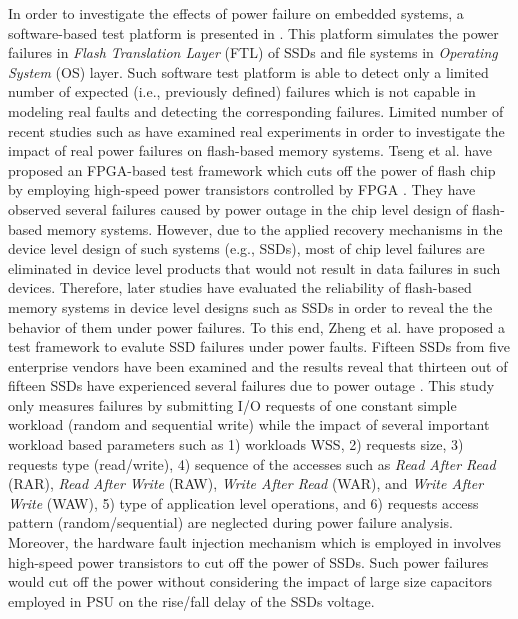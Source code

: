 In order to investigate the effects of power failure on embedded systems, a software-based test platform  is presented in \cite {kim2007virtual}.
 This  platform simulates the power failures in \emph{Flash Translation Layer} (FTL) of SSDs and file systems in \emph{Operating System} (OS) layer. Such software test platform is able to detect only a limited number of expected (i.e., previously defined) failures which is not capable in modeling real faults and detecting the corresponding failures. 
Limited number of recent studies such as \cite{tseng2011understanding, zheng2013understanding} have examined real experiments in order to investigate the impact of real power failures on flash-based memory systems. Tseng et al. have proposed an FPGA-based test framework which cuts off the power of flash chip by employing high-speed power transistors controlled by FPGA \cite{tseng2011understanding}. They have observed several failures caused by power outage in the chip level design of flash-based memory systems.
However, due to the applied recovery mechanisms in the device level design of such systems (e.g., SSDs), most of chip level failures are eliminated in device level products that would not result in data failures in such devices. Therefore, later studies have evaluated the reliability of flash-based memory systems in device level designs such as SSDs in order to reveal the the behavior of them under power failures.
To this end, Zheng et al. have proposed a test framework to evalute SSD failures under power faults. Fifteen SSDs from five enterprise vendors have been examined and the results reveal that thirteen out of fifteen SSDs have experienced several failures due to power outage \cite{zheng2013understanding}.
This study only measures failures by submitting I/O requests of one constant simple workload (random and sequential write) while the 
impact of  several important workload based parameters such as 
1) workloads WSS, 2) requests size, 3) requests type (read/write), 4) sequence of the accesses such as \emph{Read After Read} (RAR), \emph{Read After Write} (RAW), \emph{Write After Read} (WAR), and \emph{Write After Write} (WAW), 5) type of application level operations, and 6) requests access pattern (random/sequential)
 are neglected during power failure analysis. Moreover, the hardware fault injection mechanism which is employed in \cite{tseng2011understanding, zheng2013understanding} involves high-speed power transistors to cut off the power of SSDs. Such power failures would cut off the power without considering the impact of large size capacitors employed in PSU on the rise/fall delay of the SSDs voltage.
 
